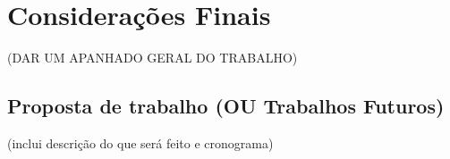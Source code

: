 \chapter{Considerações Finais}
\label{cap-consideracoesFinais}


(DAR UM APANHADO GERAL DO TRABALHO)






\section{Proposta de trabalho (OU Trabalhos Futuros)}

(inclui descrição do que será feito e cronograma)